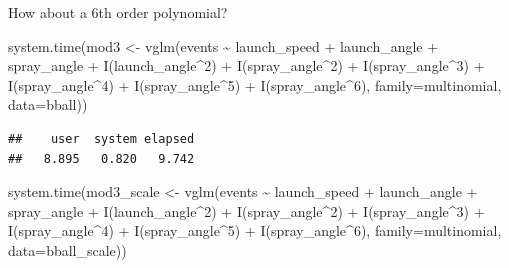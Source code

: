 \documentclass[
  ignorenonframetext,
]{beamer}
\newenvironment{Shaded}{\begin{snugshade}}{\end{snugshade}}
\newcommand{\AttributeTok}[1]{\textcolor[rgb]{0.77,0.63,0.00}{#1}}
\newcommand{\DecValTok}[1]{\textcolor[rgb]{0.00,0.00,0.81}{#1}}
\newcommand{\FunctionTok}[1]{\textcolor[rgb]{0.00,0.00,0.00}{#1}}
\newcommand{\NormalTok}[1]{#1}
\newcommand{\OtherTok}[1]{\textcolor[rgb]{0.56,0.35,0.01}{#1}}
\newcommand{\SpecialCharTok}[1]{\textcolor[rgb]{0.00,0.00,0.00}{#1}}
\begin{document}
\begin{frame}[fragile]{}
\protect\hypertarget{section-12}{}
How about a 6th order polynomial?

\vspace{12pt}
\tiny

\begin{Shaded}
\begin{Highlighting}[]
\FunctionTok{system.time}\NormalTok{(mod3 }\OtherTok{\textless{}{-}} \FunctionTok{vglm}\NormalTok{(events }\SpecialCharTok{\textasciitilde{}}\NormalTok{ launch\_speed }\SpecialCharTok{+}\NormalTok{ launch\_angle }\SpecialCharTok{+}\NormalTok{ spray\_angle }\SpecialCharTok{+} 
               \FunctionTok{I}\NormalTok{(launch\_angle}\SpecialCharTok{\^{}}\DecValTok{2}\NormalTok{) }\SpecialCharTok{+} \FunctionTok{I}\NormalTok{(spray\_angle}\SpecialCharTok{\^{}}\DecValTok{2}\NormalTok{) }\SpecialCharTok{+} \FunctionTok{I}\NormalTok{(spray\_angle}\SpecialCharTok{\^{}}\DecValTok{3}\NormalTok{) }\SpecialCharTok{+} 
               \FunctionTok{I}\NormalTok{(spray\_angle}\SpecialCharTok{\^{}}\DecValTok{4}\NormalTok{) }\SpecialCharTok{+} \FunctionTok{I}\NormalTok{(spray\_angle}\SpecialCharTok{\^{}}\DecValTok{5}\NormalTok{) }\SpecialCharTok{+} \FunctionTok{I}\NormalTok{(spray\_angle}\SpecialCharTok{\^{}}\DecValTok{6}\NormalTok{),}
             \AttributeTok{family=}\NormalTok{multinomial, }\AttributeTok{data=}\NormalTok{bball))}
\end{Highlighting}
\end{Shaded}

\begin{verbatim}
##    user  system elapsed 
##   8.895   0.820   9.742
\end{verbatim}

\begin{Shaded}
\begin{Highlighting}[]
\FunctionTok{system.time}\NormalTok{(mod3\_scale }\OtherTok{\textless{}{-}} \FunctionTok{vglm}\NormalTok{(events }\SpecialCharTok{\textasciitilde{}}\NormalTok{ launch\_speed }\SpecialCharTok{+}\NormalTok{ launch\_angle }\SpecialCharTok{+}\NormalTok{ spray\_angle }\SpecialCharTok{+} 
               \FunctionTok{I}\NormalTok{(launch\_angle}\SpecialCharTok{\^{}}\DecValTok{2}\NormalTok{) }\SpecialCharTok{+} \FunctionTok{I}\NormalTok{(spray\_angle}\SpecialCharTok{\^{}}\DecValTok{2}\NormalTok{) }\SpecialCharTok{+} \FunctionTok{I}\NormalTok{(spray\_angle}\SpecialCharTok{\^{}}\DecValTok{3}\NormalTok{) }\SpecialCharTok{+} 
               \FunctionTok{I}\NormalTok{(spray\_angle}\SpecialCharTok{\^{}}\DecValTok{4}\NormalTok{) }\SpecialCharTok{+} \FunctionTok{I}\NormalTok{(spray\_angle}\SpecialCharTok{\^{}}\DecValTok{5}\NormalTok{) }\SpecialCharTok{+} \FunctionTok{I}\NormalTok{(spray\_angle}\SpecialCharTok{\^{}}\DecValTok{6}\NormalTok{), }
             \AttributeTok{family=}\NormalTok{multinomial, }\AttributeTok{data=}\NormalTok{bball\_scale))}
\end{Highlighting}
\end{Shaded}


\end{frame}
\end{document}
